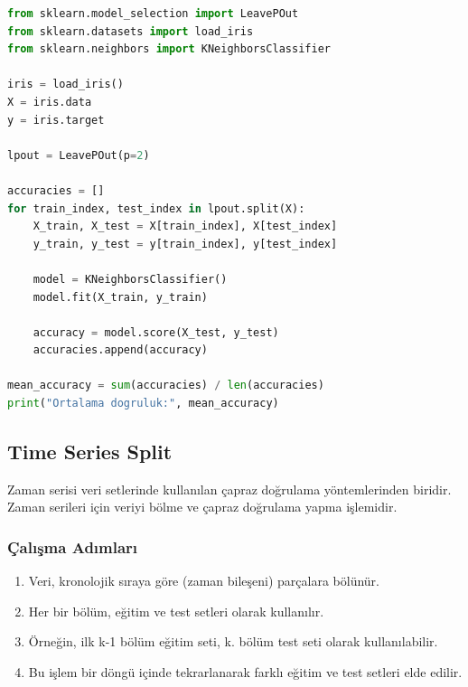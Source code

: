 \begin{lstlisting}[language=Python, caption=Scikit-learn'de Leave P-Out örneği.]
from sklearn.model_selection import LeavePOut
from sklearn.datasets import load_iris
from sklearn.neighbors import KNeighborsClassifier

iris = load_iris()
X = iris.data
y = iris.target

lpout = LeavePOut(p=2)

accuracies = []
for train_index, test_index in lpout.split(X):
    X_train, X_test = X[train_index], X[test_index]
    y_train, y_test = y[train_index], y[test_index]
    
    model = KNeighborsClassifier()
    model.fit(X_train, y_train)
    
    accuracy = model.score(X_test, y_test)
    accuracies.append(accuracy)

mean_accuracy = sum(accuracies) / len(accuracies)
print("Ortalama dogruluk:", mean_accuracy)
\end{lstlisting}


\subsection{Time Series Split}
Zaman serisi veri setlerinde kullanılan çapraz doğrulama yöntemlerinden biridir. Zaman serileri için veriyi bölme ve çapraz doğrulama yapma işlemidir.

\subsubsection{Çalışma Adımları}
\begin{enumerate}
    \item Veri, kronolojik sıraya göre (zaman bileşeni) parçalara bölünür.
    \item Her bir bölüm, eğitim ve test setleri olarak kullanılır.
    \item Örneğin, ilk k-1 bölüm eğitim seti, k. bölüm test seti olarak kullanılabilir.
    \item Bu işlem bir döngü içinde tekrarlanarak farklı eğitim ve test setleri elde edilir.
\end{enumerate}

\newpage

